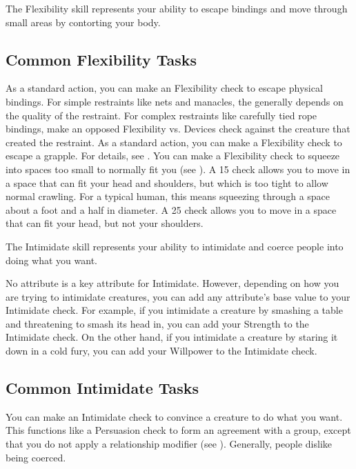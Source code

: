 \newpage
{}
    The Flexibility skill represents your ability to escape bindings and move through small areas by contorting your body.

    \subsection{Common Flexibility Tasks}

         As a standard action, you can make an Flexibility check to escape physical bindings.
        For simple restraints like nets and manacles, the  generally depends on the quality of the restraint.
        For complex restraints like carefully tied rope bindings, make an opposed Flexibility vs. Devices check against the creature that created the restraint.
         As a standard action, you can make a Flexibility check to escape a grapple.
        For details, see .
         You can make a Flexibility check to squeeze into spaces too small to normally fit you (see ).
        A  15 check allows you to move in a space that can fit your head and shoulders, but which is too tight to allow normal crawling.
        For a typical human, this means squeezing through a space about a foot and a half in diameter.
        A  25 check allows you to move in a space that can fit your head, but not your shoulders.

\newpage
{}
    The Intimidate skill represents your ability to intimidate and coerce people into doing what you want.

        No attribute is a key attribute for Intimidate.
        However, depending on how you are trying to intimidate creatures, you can add any attribute's base value to your Intimidate check.
        For example, if you intimidate a creature by smashing a table and threatening to smash its head in, you can add your Strength to the Intimidate check.
        On the other hand, if you intimidate a creature by staring it down in a cold fury, you can add your Willpower to the Intimidate check.

    \subsection{Common Intimidate Tasks}
         You can make an Intimidate check to convince a creature to do what you want. This functions like a Persuasion check to form an agreement with a group, except that you do not apply a relationship modifier (see ).
        Generally, people dislike being coerced.

